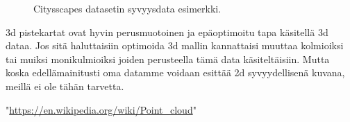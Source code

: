 \begin{figure}[h]
\centering
{}
\caption[Tämä on lyhyt kuvateksti.]{Citysscapes datasetin syvyysdata esimerkki.}
\label{fig:depth}
\end{figure}

3d pistekartat ovat hyvin perusmuotoinen ja epäoptimoitu tapa käsitellä 3d dataa. Jos sitä haluttaisiin optimoida 3d mallin kannattaisi muuttaa kolmioiksi tai muiksi monikulmioiksi joiden perusteella tämä data käsiteltäisiin. Mutta koska edellämainitusti oma datamme voidaan esittää 2d syvyydellisenä kuvana, meillä ei ole tähän tarvetta.

    
"\url{https://en.wikipedia.org/wiki/Point_cloud}"

